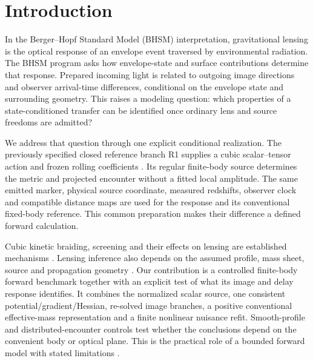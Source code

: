 \section{Introduction}
In the Berger--Hopf Standard Model (BHSM) interpretation, gravitational
lensing is the optical response of an envelope event traversed by
environmental radiation. The BHSM program asks how envelope-state and
surface contributions determine that response. Prepared incoming light is related to outgoing
image directions and observer arrival-time differences, conditional on
the envelope state and surrounding geometry. This raises a modeling
question: which properties of a state-conditioned transfer can be
identified once ordinary lens and source freedoms are admitted?

We address that question through one explicit conditional realization.
The previously specified closed reference branch R1 supplies a cubic
scalar--tensor action and frozen rolling coefficients
\citep{CarberryRepository}. Its regular finite-body source determines
the metric and projected encounter without a fitted local amplitude.
The same emitted marker, physical source coordinate, measured redshifts,
observer clock and compatible distance maps \citep{Fleury2021arbitrary} are used for the response
and its conventional fixed-body reference. This common preparation
makes their difference a defined forward calculation.

Cubic kinetic braiding, screening and their effects on lensing are
established mechanisms \citep{Deffayet2010,Barreira2013,Barreira2015}.
Lensing inference also depends on the assumed profile, mass sheet,
source and propagation geometry
\citep{SchneiderSluse2013,Fleury2021los,Teodori2022,Saha2024}.
Our contribution is a controlled finite-body forward benchmark together
with an explicit test of what its image and delay response identifies.
It combines the normalized scalar source, one consistent
potential/gradient/Hessian, re-solved image branches, a positive
conventional effective-mass representation and a finite nonlinear
nuisance refit. Smooth-profile and distributed-encounter controls test
whether the conclusions depend on the convenient body or optical plane.
This is the practical role of a bounded forward model with stated
limitations \citep{Schechter2026}.

